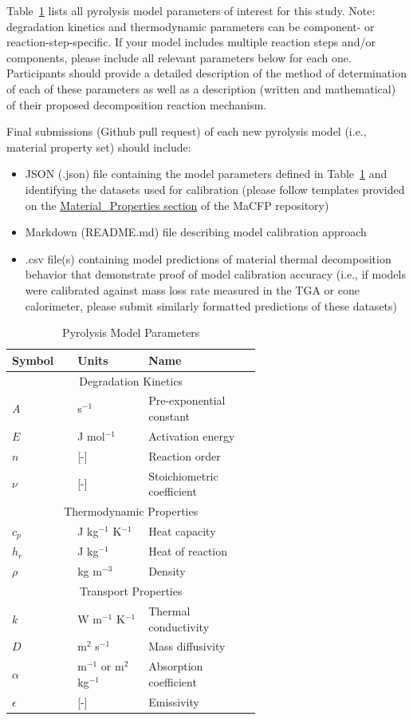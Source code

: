 \documentclass[12pt]{article}
\begin{document}
Table~\ref{table:properties} lists all pyrolysis model parameters of interest for this study. Note: degradation kinetics and thermodynamic parameters can be component- or reaction-step-specific. If your model includes multiple reaction steps and/or components, please include all relevant parameters below for each one. Participants should provide a detailed description of the method of determination of each of these parameters as well as a description (written and mathematical) of their proposed decomposition reaction mechanism. 

Final submissions (Github pull request) of each new pyrolysis model (i.e., material property set) should include: 
\begin{itemize}[noitemsep]
\item JSON (.json) file containing the model parameters defined in Table~\ref{table:properties} and identifying the datasets used for calibration (please follow templates provided on the \href{https://github.com/MaCFP/matl-db/tree/master/PMMA/Material_Properties}{Material\_Properties section} of the MaCFP repository)
\item Markdown (README.md) file describing model calibration approach
\item .csv file(s) containing model predictions of material thermal decomposition behavior that demonstrate proof of model calibration accuracy (i.e., if models were calibrated against mass loss rate measured in the TGA or cone calorimeter, please submit similarly formatted predictions of these datasets)
\end{itemize}


\begin{table}[htb]
\centering
\caption{ Pyrolysis Model Parameters}
\label{table:properties}
\begin{tabular}{p{0.125\linewidth} | p{0.2\linewidth}| p{0.3\linewidth}}
\hline
\textbf{Symbol}       	& \textbf{Units} & \textbf{Name}\\
\hline
\multicolumn{3}{c}{Degradation Kinetics}\\
\hline
$A$	&s$^{-1}$		&Pre-exponential constant \\
$E$	&J mol$^{-1}$	&Activation energy \\
$n$	&[-]		&Reaction order\\
$\nu$	&[-]		&Stoichiometric coefficient\\
\hline		
\multicolumn{3}{c}{Thermodynamic Properties}\\
\hline
$c_p$	&J kg$^{-1}$ K$^{-1}$	&Heat capacity\\
$h_r$	&J kg$^{-1}$		&Heat of reaction\\
$\rho$	&kg m$^{-3}$		&Density\\
\hline		
\multicolumn{3}{c}{Transport Properties}\\
\hline
$k$	&W m$^{-1}$ K$^{-1}$	&Thermal conductivity\\
$D$	&m$^2$ s$^{-1}$		&Mass diffusivity\\
$\alpha$	&m$^{-1}$ or m$^2$ kg$^{-1}$	&Absorption coefficient\\
$\epsilon$	&[-]				&Emissivity\\
\hline
\end{tabular}
\end{table}
\end{document}
